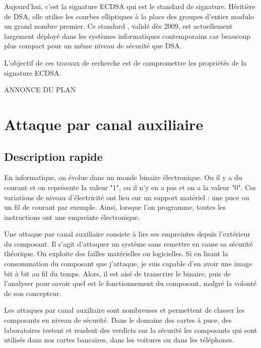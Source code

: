 \documentclass{backend}
\begin{document}
Aujourd'hui, c'est la signature ECDSA qui est le standard de signature. Héritière de DSA, elle utilise les courbes elliptiques à la place des groupes d'entier modulo un grand nombre premier. Ce standard \cite{ecdsaFIPS}, validé dès 2009, est actuellement largement déployé dans les systèmes informatiques contemporains car beaucoup plus compact pour un même niveau de sécurité que DSA.\medbreak

L'objectif de ces travaux de recherche est de compromettre les propriétés de la signature ECDSA. 

\bigbreak

ANNONCE DU PLAN

\newpage

%
%

\section{Attaque par canal auxiliaire}

\subsection{Description rapide}

En informatique, on évolue dans un monde binaire électronique. Ou il y a du courant et on représente la valeur "1", ou il n'y en a pas et on a la valeur "0". Ces variations de niveau d'électricité ont lieu sur un support matériel : une puce ou un fil de courant par exemple. Ainsi, lorsque l'on programme, toutes les instructions ont une empreinte électronique.\medbreak

Une attaque par canal auxiliaire consiste à lire ses empreintes depuis l'extérieur du composant. Il s'agit d'attaquer un système sans remettre en cause sa sécurité théorique. On exploite des failles matérielles ou logicielles. Si en lisant la consommation du composant que j'attaque, je suis capable d'en avoir une image bit à bit au fil du temps. Alors, il est aisé de transcrire le binaire, puis de l'analyser pour savoir quel est le fonctionnement du composant, malgré la volonté de son concepteur.\medbreak


Les attaques par canal auxiliaire sont nombreuses et permettent de classer les composants en niveau de sécurité. Dans le domaine des cartes à puce, des laboratoires testent et rendent des verdicts sur la sécurité les composants qui sont utilisés dans nos cartes bancaires, dans les voitures ou dans les téléphones.
\end{document}
